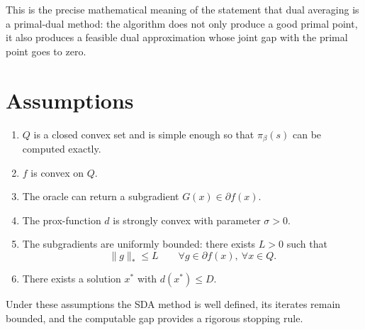 \documentclass[12pt,a4paper]{article}
\begin{document}
This is the precise mathematical meaning of the statement that dual averaging is a primal-dual method: the algorithm does not only produce a good primal point, it also produces a feasible dual approximation whose joint gap with the primal point goes to zero.

\section{Assumptions}
\begin{enumerate}[label=(A\arabic*),leftmargin=1.2cm]
    \item $Q$ is a closed convex set and is simple enough so that $\pi_\beta(s)$ can be computed exactly.
    \item $f$ is convex on $Q$.
    \item The oracle can return a subgradient $G(x) \in \partial f(x)$.
    \item The prox-function $d$ is strongly convex with parameter $\sigma>0$.
    \item The subgradients are uniformly bounded: there exists $L>0$ such that
    \begin{equation}
        \|g\|_* \le L \qquad \forall g \in \partial f(x),\ \forall x \in Q.
    \end{equation}
    \item There exists a solution $x^*$ with $d(x^*) \le D$.
\end{enumerate}
Under these assumptions the SDA method is well defined, its iterates remain bounded, and the computable gap provides a rigorous stopping rule.

\end{document}
